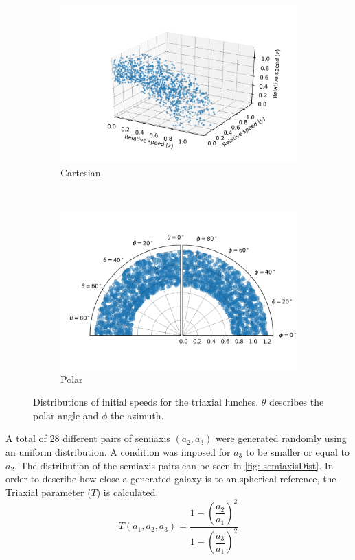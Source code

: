 	\begin{figure}[h]
		\centering
		\begin{subfigure}[b]{0.49\textwidth}
			\includegraphics[width = \textwidth]{"../Files/Week 13/3d_initial_speeds"}
			\caption{Cartesian}
		\end{subfigure}
		~ 
		\begin{subfigure}[b]{0.49\textwidth}
			\includegraphics[width=\textwidth]{"../Files/Week 13/polar_initial_speeds"}
			\caption{Polar}
		\end{subfigure}
		\caption{Distributions of initial speeds for the triaxial lunches. $\theta$ describes the polar angle and $\phi$ the azimuth.}
		\label{fig: initialSpeedDistributions}
	\end{figure}

	A total of 28 different pairs of semiaxis $(a_2, a_3)$ were generated randomly using an uniform distribution. A condition was imposed for $a_3$ to be smaller or equal to $a_2$. The distribution of the semiaxis pairs can be seen in \autoref{fig: semiaxisDist}. In order to describe how close a generated galaxy is to an spherical reference, the Triaxial parameter ($T$) is calculated.
	\begin{equation}\label{eq: triaxialParameter}
		T(a_1, a_2, a_3) = \dfrac{1 - \left(\dfrac{a_2}{a_1}\right)^2}{1 - \left(\dfrac{a_3}{a_1}\right)^2}
	\end{equation}
	

